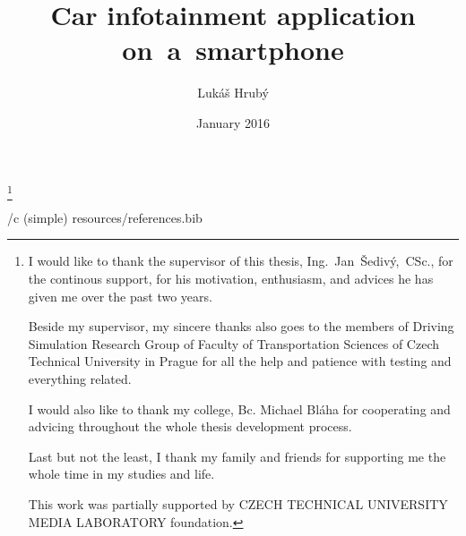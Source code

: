 

\worktype [M/EN]
\title {Car infotainment application on~a~smartphone}
\author {Lukáš Hrubý}
\date {January 2016}
\thanks{
I would like to thank the supervisor of this thesis, Ing.~Jan~\v Sediv\' y,~CSc., for the continous support, for his motivation, enthusiasm, and advices he has given me over the past two years. 

Beside my supervisor, my sincere thanks also goes to the members of Driving Simulation Research Group of Faculty of Transportation Sciences of Czech Technical University in Prague for all the help and patience with testing and everything related. 

I would also like to thank my college, Bc. Michael Bl\'aha for cooperating and advicing throughout the whole thesis development process. 

Last but not the least, I thank my family and friends for supporting me the whole time in my studies and life.

\hfil\break

This work was partially supported by CZECH TECHNICAL UNIVERSITY MEDIA LABORATORY foundation.}

\draft


\makefront


\nextoddpage


\nextoddpage


\nextoddpage


\nextoddpage


\nextoddpage


\nextoddpage

\bibchap
\usebib/c (simple) resources/references.bib

\bye